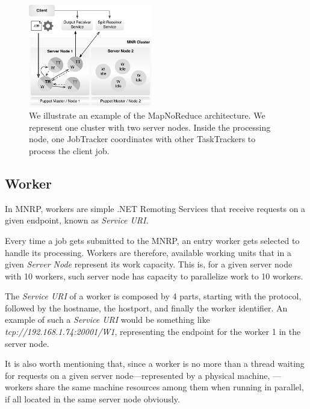 \documentclass[times, 10pt,twocolumn]{article}
\begin{document}
        \begin{figure}[!h]
            \begin{center}
                \includegraphics[width=0.48\textwidth]{pics/architecture.pdf}
                \caption{We illustrate an example of the MapNoReduce architecture. We represent one cluster with two server nodes. Inside the processing node, one JobTracker coordinates with other TaskTrackers to process the client job.  }
                \label{fig:mnr-architecture}
            \end{center}
        \end{figure}
        
    	\subsection{Worker}
        
        In \ac{MNRP}, workers are simple .NET Remoting Services that receive requests on a given endpoint, known as \textit{Service URI}. 
        
        Every time a job gets submitted to the \ac{MNRP}, an entry worker gets selected to handle its processing. Workers are therefore, available working units that in a given \textit{Server Node} represent its work capacity. This is, for a given server node with 10 workers, such server node has capacity to parallelize work to 10 workers.
        
        The \textit{Service URI} of a worker is composed by 4 parts, starting with the protocol, followed by the hostname, the hostport, and finally the worker identifier. An example of such a \textit{Service URI} would be something like \textit{tcp://192.168.1.74:20001/W1}, representing the endpoint for the worker 1 in the server node.
        
        It is also worth mentioning that, since a worker is no more than a thread waiting for requests on a given server node—represented by a physical machine, —workers share the same machine resources among them when running in parallel, if all located in the same server node obviously.
        
\end{document}
